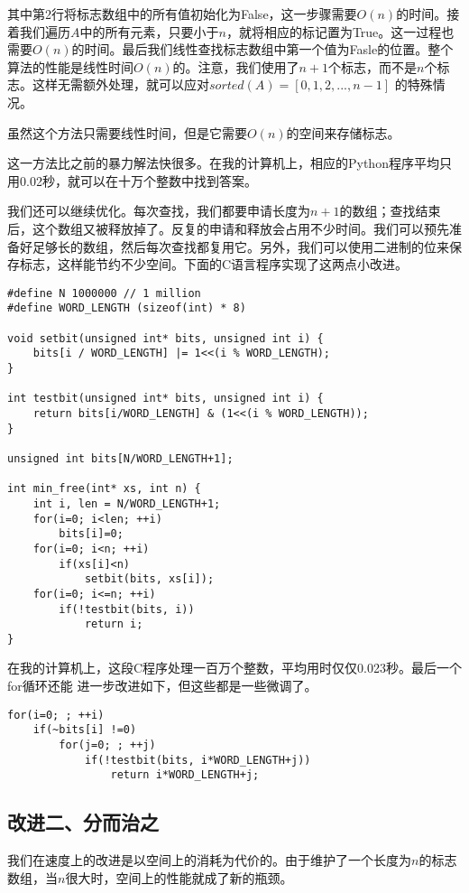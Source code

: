 \documentclass{article}
\begin{document}
其中第2行将标志数组中的所有值初始化为False，这一步骤需要$O(n)$的时间。接着我们遍历$A$中的所有元素，只要小于$n$，就将相应的标记置为True。这一过程也需要$O(n)$的时间。最后我们线性查找标志数组中第一个值为Fasle的位置。整个算法的性能是线性时间$O(n)$的。注意，我们使用了$n+1$个标志，而不是$n$个标志。这样无需额外处理，就可以应对$sorted(A) = [0, 1, 2, ..., n-1]$
的特殊情况。

虽然这个方法只需要线性时间，但是它需要$O(n)$的空间来存储标志。

这一方法比之前的暴力解法快很多。在我的计算机上，相应的Python程序平均只用0.02秒，就可以在十万个整数中找到答案。

我们还可以继续优化。每次查找，我们都要申请长度为$n+1$的数组；查找结束后，这个数组又被释放掉了。反复的申请和释放会占用不少时间。我们可以预先准备好足够长的数组，然后每次查找都复用它。另外，我们可以使用二进制的位来保存标志，这样能节约不少空间。下面的C语言程序实现了这两点小改进。

\lstset{language=C}
\begin{lstlisting}
#define N 1000000 // 1 million
#define WORD_LENGTH (sizeof(int) * 8)

void setbit(unsigned int* bits, unsigned int i) {
    bits[i / WORD_LENGTH] |= 1<<(i % WORD_LENGTH);
}

int testbit(unsigned int* bits, unsigned int i) {
    return bits[i/WORD_LENGTH] & (1<<(i % WORD_LENGTH));
}

unsigned int bits[N/WORD_LENGTH+1];

int min_free(int* xs, int n) {
    int i, len = N/WORD_LENGTH+1;
    for(i=0; i<len; ++i)
        bits[i]=0;
    for(i=0; i<n; ++i)
        if(xs[i]<n)
            setbit(bits, xs[i]);
    for(i=0; i<=n; ++i)
        if(!testbit(bits, i))
            return i;
}
\end{lstlisting}

在我的计算机上，这段C程序处理一百万个整数，平均用时仅仅0.023秒。最后一个for循环还能
进一步改进如下，但这些都是一些微调了。

\begin{lstlisting}
for(i=0; ; ++i)
    if(~bits[i] !=0)
        for(j=0; ; ++j)
	        if(!testbit(bits, i*WORD_LENGTH+j))
	            return i*WORD_LENGTH+j;
\end{lstlisting}

\subsection{改进二、分而治之}
我们在速度上的改进是以空间上的消耗为代价的。由于维护了一个长度为$n$的标志数组，当$n$很大时，空间上的性能就成了新的瓶颈。
\end{document}
